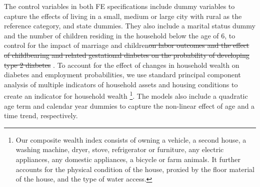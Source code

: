 \documentclass[12pt,english]{article}
\providecommand{\DIFaddtex}[1]{{\protect\color{blue}\uwave{#1}}} %
\providecommand{\DIFdeltex}[1]{{\protect\color{red}\sout{#1}}}                      %
\providecommand{\DIFaddbegin}{} %
\providecommand{\DIFaddend}{} %
\providecommand{\DIFdelbegin}{} %
\providecommand{\DIFdelend}{} %
\providecommand{\DIFadd}[1]{\texorpdfstring{\DIFaddtex{#1}}{#1}} %
\providecommand{\DIFdel}[1]{\texorpdfstring{\DIFdeltex{#1}}{}} %
\begin{document}
The control variables in both \ac{FE} specifications include dummy variables to capture the effects of living in a small, medium or large city with rural as the reference category, and state dummies. They also include a marital status dummy and the number of children residing in the household below the age of 6, to control for \DIFaddbegin \DIFadd{both }\DIFaddend the impact of marriage and children\DIFdelbegin \DIFdel{on labor outcomes and the effect of childbearing and related gestational diabetes on the probability of developing type 2 diabetes
}%
\DIFdelend . To account for the effect of changes in household wealth on diabetes and employment probabilities, we use standard
principal component analysis of multiple indicators of household assets and housing conditions to create an indicator for household wealth \parencite{Filmer2001}\footnote{Our composite wealth index consists of owning a vehicle, a second house, a washing machine, dryer, stove, refrigerator or furniture, any electric appliances, any domestic appliances, a bicycle or farm animals. It further accounts for the physical condition of the house, proxied by the floor material of the house, and the type of water access.}. The models also include a quadratic age term and calendar year dummies to capture the non-linear effect of age and a time trend, respectively.
\end{document}
